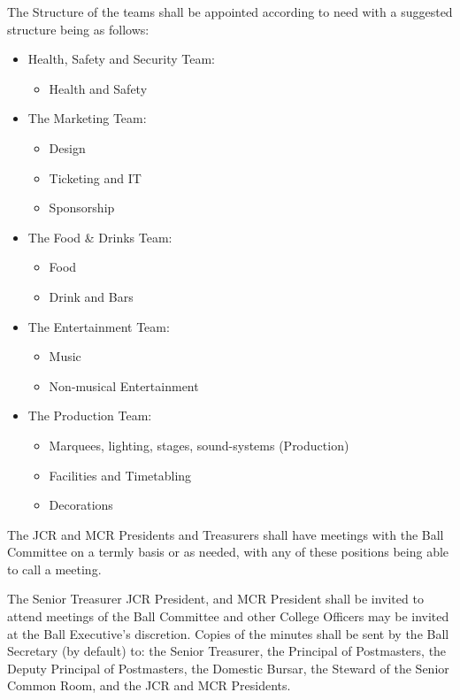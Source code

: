 \appnpara The Structure of the teams shall be appointed according to need with a suggested structure being as follows:
\begin{itemize}
    \item Health, Safety and Security Team: 
    \begin{itemize}
        \item Health and Safety
    \end{itemize}
    \item The Marketing Team:
    \begin{itemize}
        \item Design
        \item Ticketing and IT
        \item Sponsorship
    \end{itemize}
    \item The Food \& Drinks Team:
    \begin{itemize}
        \item Food
        \item Drink and Bars
    \end{itemize}
    \item The Entertainment Team:
    \begin{itemize}
        \item Music
        \item Non-musical Entertainment
    \end{itemize}
    \item The Production Team:
    \begin{itemize}
        \item Marquees, lighting, stages, sound-systems (Production)
        \item Facilities and Timetabling
        \item Decorations
    \end{itemize}
\end{itemize}

\appnpara The JCR and MCR Presidents and Treasurers shall have meetings with the Ball Committee on a termly basis or as needed, with any of these positions being able to call a meeting.

\appnpara The Senior Treasurer JCR President, and MCR President shall be invited to attend meetings of the Ball Committee and other College Officers may be invited at the Ball Executive’s discretion. Copies of the minutes shall be sent by the Ball Secretary (by default) to: the Senior Treasurer, the Principal of Postmasters, the Deputy Principal of Postmasters, the Domestic Bursar, the Steward of the Senior Common Room, and the JCR and MCR Presidents.  

